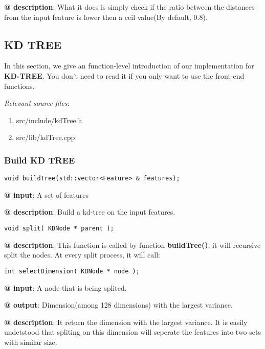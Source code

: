 \documentclass[paper=a4, fontsize=11pt]{scrartcl} %
\numberwithin{equation}{section} %
\numberwithin{figure}{section} %
\numberwithin{table}{section} %
\begin{document}
\textbf{@ description}: What it does is simply check if the ratio between the distances from the input feature is lower then a ceil value(By default, 0.8).

\subsection{KD TREE}

In this section, we give an function-level introduction of our implementation for \textbf{KD-TREE}. You don't need to read it if you only want to use the front-end functions. 

\textsl{Relevant source files}: 

\begin{enumerate}
\item src/include/kdTree.h
\item src/lib/kdTree.cpp
\end{enumerate}

\subsubsection{Build KD TREE}

\begin{lstlisting}
void buildTree(std::vector<Feature> & features);
\end{lstlisting}

\textbf{@ input}: A set of features

\textbf{@ description}: Build a kd-tree on the input features.\\

\begin{lstlisting}
void split( KDNode * parent );
\end{lstlisting}

\textbf{@ description}: This function is called by function \textbf{buildTree()}, it will recursive split the nodes. At every split process, it will call: 

\begin{lstlisting}
int selectDimension( KDNode * node );
\end{lstlisting}

\textbf{@ input}: A node that is being splited.

\textbf{@ output}: Dimension(among 128 dimensions) with the largest variance.

\textbf{@ description}: It return the dimension with the largest variance. It is easily undetstood that spliting on this dimension will seperate the features into two sets with similar size. \\
\end{document}
